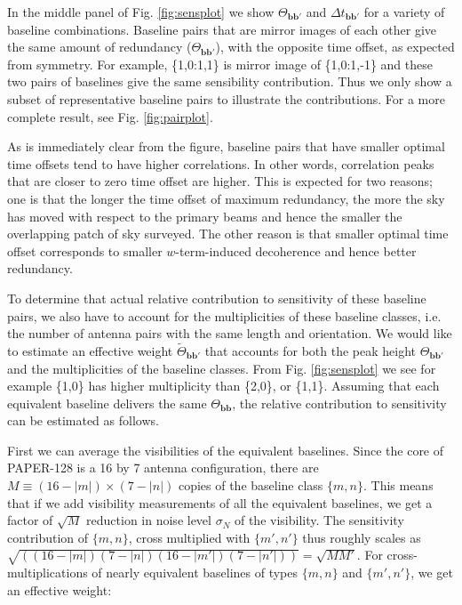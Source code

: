 \documentclass[twocolumn,apj,numberedappendix]{emulateapj}
\renewcommand\[{\begin{equation}}
\renewcommand\]{\end{equation}}
\begin{document}
In the middle panel of Fig. \ref{fig:sensplot}
we show $\Theta_{\boldsymbol{bb'}}$ and $\Delta t_{\boldsymbol{bb'}}$ for a variety of baseline combinations. Baseline pairs that are mirror images of each other 
give the same amount of redundancy ($\Theta_{\boldsymbol{bb'}}$), with the opposite time offset, as expected from symmetry. 
For example, \{1,0:1,1\} is mirror image of \{1,0:1,-1\} and these two pairs of baselines
give the same sensibility contribution. Thus we only show a subset of representative baseline pairs to illustrate the contributions. For a more complete result, see Fig. \ref{fig:pairplot}.  

As is immediately clear from the figure, baseline pairs that have smaller optimal time offsets
tend to have higher correlations. In other words, correlation peaks
that are closer to zero time offset are higher. This is expected for two reasons;
one is that the longer the time offset of maximum redundancy, the more the sky has moved with respect
to the primary beams and hence the smaller the overlapping patch of sky surveyed. The other reason is that smaller optimal
time offset corresponds to smaller $w$-term-induced decoherence and hence better redundancy. 


To determine that actual relative contribution to sensitivity of these
baseline pairs, we also have to account for the multiplicities of
these baseline classes, i.e. the number of antenna pairs with the
same length and orientation. We would like to estimate an effective weight $\widetilde{\Theta}_{\boldsymbol{bb'}}$ that accounts for both the peak height $\Theta_{\boldsymbol{bb'}}$ and the multiplicities of the baseline classes. From Fig. \ref{fig:sensplot}
we see for example \{1,0\} has higher multiplicity than \{2,0\},
or \{1,1\}. Assuming that each equivalent baseline delivers
the same $\Theta_{\boldsymbol{bb}}$, the relative contribution to sensitivity can be estimated as follows. 

First we can average the visibilities of the equivalent baselines. Since the core of PAPER-128 is a 16 by 7 antenna configuration, there
are $M\equiv(16-|m|)\times(7-|n|)$ copies of the baseline class $\{m,n\}$. This means
that if we add visibility measurements of all the equivalent baselines,
we get a factor of $\sqrt{M}$ reduction in noise
level $\sigma_N$ of the visibility. The sensitivity contribution of $\{m,n\}$, cross multiplied with $\{m',n'\}$  thus roughly scales as $\sqrt{\left((16-|m|)(7-|n|)(16-|m'|)(7-|n'|)\right)}=\sqrt{MM'}$.
For cross-multiplications of nearly equivalent baselines of
types $\{m,n\}$ and $\{m',n'\}$, we get an effective weight: 
\end{document}
